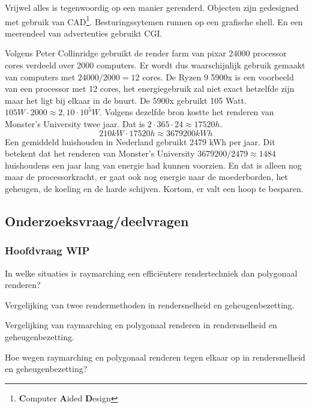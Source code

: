 \documentclass[12pt, a4paper]{article}
\begin{document}
Vrijwel alles is tegenwoordig op een manier gerenderd. Objecten zijn gedesigned met gebruik van CAD\footnote{\textbf{C}omputer \textbf{A}ided \textbf{D}esign}. Besturingssytemen runnen op een grafische shell. En een meerendeel van advertenties gebruikt CGI.

Volgens Peter Collinridge\cite{ScienceBehindPixarRendering} gebruikt de render farm van pixar 24000 processor cores verdeeld over 2000 computers. Er wordt dus waarschijnlijk gebruik gemaakt van computers met \(24000/2000=12\) cores. De Ryzen 9 5900x is een voorbeeld van een processor met 12 cores, het energiegebruik zal niet exact hetzelfde zijn maar het ligt bij elkaar in de buurt. De 5900x gebruikt 105 Watt. \(105W\cdot 2000\approx 2,10\cdot 10^5W\). Volgens dezelfde bron kostte het renderen van Monster's University twee jaar. Dat is \(2\cdot 365\cdot 24\approx17520h\). \[210kW \cdot 17520h\approx 3679200kWh\] Een gemiddeld huishouden in Nederland gebruikt 2479 kWh per jaar. Dit betekent dat het renderen van Monster's University \(3679200/2479\approx 1484\) huishoudens een jaar lang van energie had kunnen voorzien. En dat is alleen nog maar de processorkracht, er gaat ook nog energie naar de moederborden, het geheugen, de koeling en de harde schijven. Kortom, er valt een hoop te besparen.
\subsection{Onderzoeksvraag/deelvragen}
\subsubsection{Hoofdvraag WIP}
In welke situaties is raymarching een efficiëntere rendertechniek dan polygonaal renderen?

Vergelijking van twee rendermethoden in rendersnelheid en geheugenbezetting.

Vergelijking van raymarching en polygonaal renderen in rendersnelheid en geheugenbezetting.

Hoe wegen raymarching en polygonaal renderen tegen elkaar op in rendersnelheid en geheugenbezetting?
\end{document}
